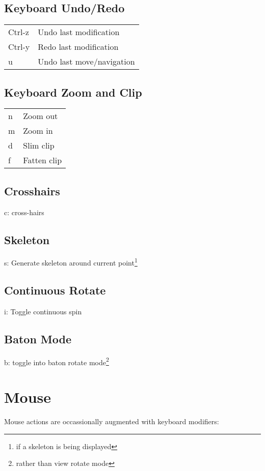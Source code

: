 \documentclass[twocolumn]{article}
\begin{document}
\subsection{Keyboard Undo/Redo}
\begin{tabular}{ll}

  Ctrl-z & Undo last modification   \\
  Ctrl-y & Redo last modification   \\
  u & Undo last move/navigation     \\
\end{tabular}

\subsection{Keyboard Zoom and Clip}

\begin{tabular}{ll}

  n & Zoom out   \\
  m & Zoom in    \\
  d & Slim clip  \\
  f & Fatten clip\\
\end{tabular}

\subsection{Crosshairs}
c: cross-hairs

\subsection{Skeleton}
s: Generate skeleton around current point\footnote{if a skeleton is being
displayed}

\subsection{Continuous Rotate}
i: Toggle continuous spin

\subsection{Baton Mode}
b: toggle into baton rotate mode\footnote{rather than view rotate
  mode}

\newpage
\section{Mouse}
Mouse actions are occassionally augmented with keyboard modifiers:
  \vspace{5mm}
\end{document}
